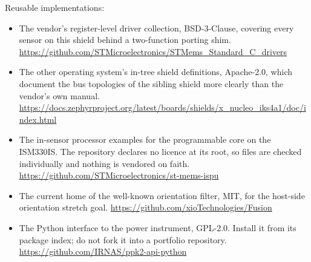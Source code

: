 Reusable implementations:
\begin{itemize}
\item The vendor's register-level driver collection, BSD-3-Clause, covering
every sensor on this shield behind a two-function porting shim.\newline
\url{https://github.com/STMicroelectronics/STMems_Standard_C_drivers}
\item The other operating system's in-tree shield definitions, Apache-2.0, which
document the bus topologies of the sibling shield more clearly than the vendor's
own manual.\newline
\url{https://docs.zephyrproject.org/latest/boards/shields/x_nucleo_iks4a1/doc/index.html}
\item The in-sensor processor examples for the programmable core on the
ISM330IS. The repository declares no licence at its root, so files are checked
individually and nothing is vendored on faith.\newline
\url{https://github.com/STMicroelectronics/st-mems-ispu}
\item The current home of the well-known orientation filter, MIT, for the
host-side orientation stretch goal.\newline
\url{https://github.com/xioTechnologies/Fusion}
\item The Python interface to the power instrument, GPL-2.0. Install it from its
package index; do not fork it into a portfolio repository.\newline
\url{https://github.com/IRNAS/ppk2-api-python}
\end{itemize}
